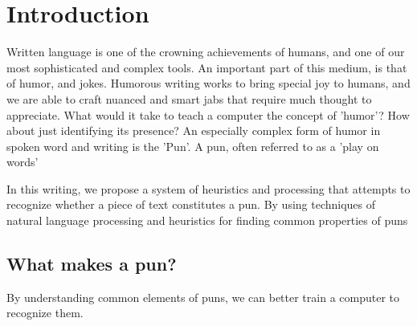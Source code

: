 \section{Introduction}

Written language is one of the crowning achievements of humans, and one of our most sophisticated and complex tools. An important part of this medium, is that of humor, and jokes. Humorous writing works to bring special joy to humans, and we are able to craft nuanced and smart jabs that require much thought to appreciate. What would it take to teach a computer the concept of 'humor'? How about just identifying its presence? An especially complex form of humor in spoken word and writing is the 'Pun'.  A pun, often referred to as a 'play on words' 

In this writing, we propose a system of heuristics and processing that attempts to recognize whether a piece of text constitutes a pun. By using techniques of natural language processing and heuristics for finding common properties of puns

\subsection{What makes a pun?}

By understanding common elements of puns, we can better train a computer to recognize them.